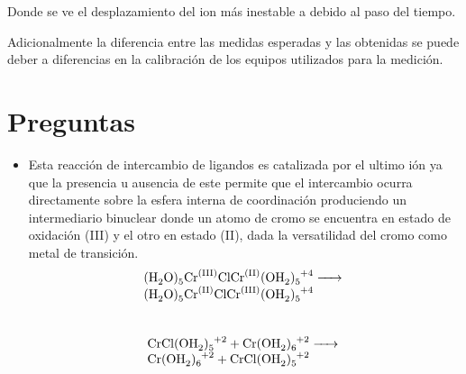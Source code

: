 \documentclass[fleqn,10pt]{SelfArx} %
\begin{document}
Donde se ve el desplazamiento del ion más inestable  a   debido al paso del tiempo.

Adicionalmente la diferencia entre las medidas esperadas y las obtenidas se puede deber a diferencias en la calibración de los equipos utilizados para la medici\'on.
	
	\section{Preguntas}
	
	\begin{itemize}
	    \item Esta reacción de intercambio de ligandos es catalizada por el ultimo ión ya que la presencia u ausencia de este permite que el intercambio ocurra directamente sobre la esfera interna de coordinación produciendo un intermediario binuclear donde un atomo de cromo se encuentra en estado de oxidación (III) y el otro en estado (II), dada la versatilidad del cromo como metal de transición.
	    \\
	    \begin{equation}
	        \begin{array}{l}
	             \ce{(H_{2}O)_{5}Cr^{(III)}ClCr^{(II)}(OH_{2})_{5}^{+4} ->} \\
	            \ce{(H_{2}O)_{5}Cr^{(II)}ClCr^{(III)}(OH_{2})_{5}^{+4}}
	        \end{array}
	   \end{equation}
	   \\
	   \begin{equation}
            \begin{array}{l}
	            \ce{CrCl(OH_{2})_{5}^{+2} + Cr(OH_{2})_{6}^{+2} ->}\\
	            \ce{Cr(OH_{2})_{6}^{+2} + CrCl(OH_{2})_{5}^{+2}}
	        \end{array}
	    \end{equation}


\end{itemize}
\end{document}
